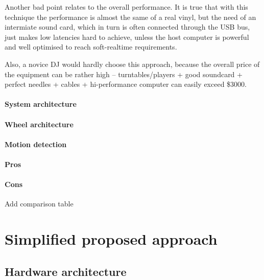 \documentclass[a4paper,10pt]{article}
\begin{document}
\begin{multicols}{2}
Another bad point relates to the overall performance. It is true that with this technique
the performance is almost the same of a real vinyl, but the need of an intermiate sound card,
which in turn is often connected through the USB bus, just makes low latencies hard to achieve,
unless the host computer is powerful and well optimised to reach soft-realtime requirements.

Also, a novice DJ would hardly choose this approach, because the overall price of the equipment
can be rather high -- turntables/players + good soundcard + perfect needles + cables +
hi-performance computer can easily exceed \$3000.


\TODO 


\paragraph{System architecture}
\TODO


\paragraph{Wheel architecture}
\TODO


\paragraph{Motion detection}
\TODO


\paragraph{Pros}
\TODO


\paragraph{Cons}
\TODO



\TODO Add comparison table


\section{Simplified proposed approach}

\TODO


\subsection{Hardware architecture}


\end{multicols}
\end{document}

